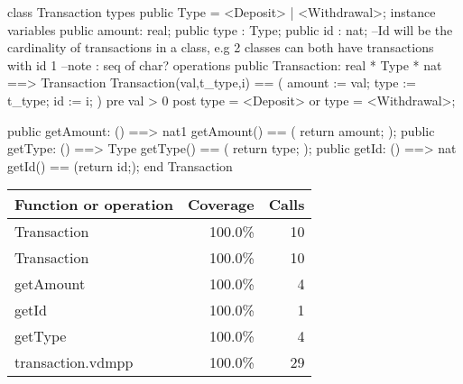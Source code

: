 \documentclass[a4paper]{article}
\begin{document}
\title{}
\author{}
\begin{vdm_al}

class Transaction
types
    public Type = <Deposit> | <Withdrawal>;
instance variables
    public amount: real;
    public type : Type; 
    public id : nat; --Id will be the cardinality of transactions in a class, e.g 2 classes can both have transactions with id 1
    --note : seq of char?
operations
    public Transaction: real * Type * nat ==> Transaction
    Transaction(val,t_type,i) == (
        amount := val;
        type := t_type;
        id := i;
    )
    pre val > 0
    post type = <Deposit> or type = <Withdrawal>;

    public getAmount: () ==> nat1
    getAmount() == (
        return amount;
    );
    public getType: () ==> Type
    getType() == (
        return type;
    );
    public getId: () ==> nat
    getId() == (return id;);
end Transaction
\end{vdm_al}
\bigskip
\begin{longtable}{|l|r|r|}
\hline
Function or operation & Coverage & Calls \\
\hline
\hline
Transaction & 100.0\% & 10 \\
\hline
Transaction & 100.0\% & 10 \\
\hline
getAmount & 100.0\% & 4 \\
\hline
getId & 100.0\% & 1 \\
\hline
getType & 100.0\% & 4 \\
\hline
\hline
transaction.vdmpp & 100.0\% & 29 \\
\hline
\end{longtable}
\end{document}
